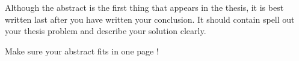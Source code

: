 
Although the abstract is the first thing that appears in the thesis, it is best written last after you have written your conclusion.  It should contain spell out your thesis problem and describe your solution clearly.

Make sure your abstract fits in one page !


